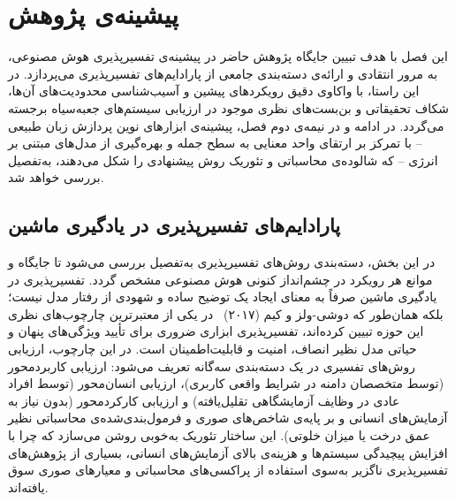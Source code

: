 
\chapter{پیشینه‌ی پژوهش}\label{chap:chapter3_literature}

این فصل با هدف تبیین جایگاه پژوهش حاضر در پیشینه‌ی تفسیرپذیری هوش مصنوعی، به مرور انتقادی و ارائه‌ی دسته‌بندی جامعی از پارادایم‌های تفسیرپذیری می‌پردازد. در این راستا، با واکاوی دقیق رویکردهای پیشین و آسیب‌شناسی محدودیت‌های آن‌ها، شکاف تحقیقاتی و بن‌بست‌های نظری موجود در ارزیابی سیستم‌های جعبه‌سیاه برجسته می‌گردد. در ادامه و در نیمه‌ی دوم فصل، پیشینه‌ی ابزارهای نوین پردازش زبان طبیعی – با تمرکز بر ارتقای واحد معنایی به سطح جمله و بهره‌گیری از مدل‌های مبتنی بر انرژی – که شالوده‌ی محاسباتی و تئوریک روش پیشنهادی را شکل می‌دهند، به‌تفصیل بررسی خواهد شد.






\section{پارادایم‌های تفسیرپذیری در یادگیری ماشین}\label{sec:3-1}

در این بخش، دسته‌بندی روش‌های تفسیرپذیری به‌تفصیل بررسی می‌شود تا جایگاه و موانع هر رویکرد در چشم‌انداز کنونی هوش مصنوعی مشخص گردد. تفسیرپذیری در یادگیری ماشین صرفاً به معنای ایجاد یک توضیح ساده و شهودی از رفتار مدل نیست؛ بلکه همان‌طور که دوشی-ولز و کیم (۲۰۱۷)~\cite{doshivelez2017rigorous} در یکی از معتبرترین چارچوب‌های نظری این حوزه تبیین کرده‌اند، تفسیرپذیری ابزاری ضروری برای تأیید ویژگی‌های پنهان و حیاتی مدل نظیر انصاف، امنیت و قابلیت‌اطمینان است. در این چارچوب، ارزیابی روش‌های تفسیری در یک دسته‌بندی سه‌گانه تعریف می‌شود: ارزیابی کاربردمحور (توسط متخصصان دامنه در شرایط واقعی کاربری)، ارزیابی انسان‌محور (توسط افراد عادی در وظایف آزمایشگاهی تقلیل‌یافته) و ارزیابی کارکردمحور (بدون نیاز به آزمایش‌های انسانی و بر پایه‌ی شاخص‌های صوری و فرمول‌بندی‌شده‌ی محاسباتی نظیر عمق درخت یا میزان خلوتی). این ساختار تئوریک به‌خوبی روشن می‌سازد که چرا با افزایش پیچیدگی سیستم‌ها و هزینه‌ی بالای آزمایش‌های انسانی، بسیاری از پژوهش‌های تفسیرپذیری ناگزیر به‌سوی استفاده از پراکسی‌های محاسباتی و معیارهای صوری سوق یافته‌اند.

